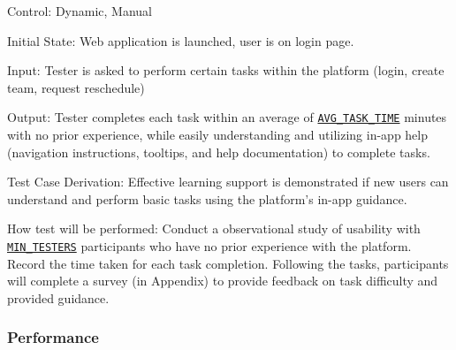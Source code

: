 \documentclass[12pt, titlepage]{article}
\begin{document}
\begin{enumerate}
        Control: Dynamic, Manual

        Initial State:  Web application is launched, user is on login page.

        Input: Tester is asked to perform certain tasks within the platform (login, create team, request reschedule)

        Output: Tester completes each task within an average of \hyperref[AVG_TASK_TIME]{\texttt{AVG\_TASK\_TIME}} minutes with no prior experience, while easily understanding and utilizing in-app help (navigation instructions, tooltips, and help documentation) to complete tasks.

        Test Case Derivation: Effective learning support is demonstrated if new users can understand and perform basic tasks using the platform's in-app guidance.

        How test will be performed: Conduct a observational study of usability with \hyperref[MIN_TESTERS]{\texttt{MIN\_TESTERS}} participants who have no prior experience with the platform. Record the time taken for each task completion. Following the tasks, participants will complete a survey (in Appendix) to provide feedback on task difficulty and provided guidance.


\end{enumerate}

\subsubsection{Performance}
\end{document}
